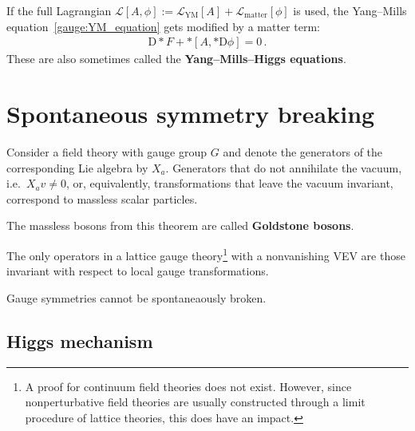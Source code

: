     If the full Lagrangian $\mathcal{L}[A,\phi]:=\mathcal{L}_{\text{YM}}[A]+\mathcal{L}_{\text{matter}}[\phi]$ is used, the Yang--Mills equation~\eqref{gauge:YM_equation} gets modified by a matter term:
    \begin{gather}
        \mathrm{D}\ast F + \ast[A,\ast\mathrm{D}\phi]=0\,.
    \end{gather}
    These are also sometimes called the \textbf{Yang--Mills--Higgs equations}.


\section{Spontaneous symmetry breaking}

    \begin{theorem}[Goldstone]
        Consider a field theory with gauge group $G$ and denote the generators of the corresponding Lie algebra by $X_a$. Generators that do not annihilate the vacuum, i.e.~$X_av\neq0$, or, equivalently, transformations that leave the vacuum invariant, correspond to massless scalar particles.
    \end{theorem}
    The massless bosons from this theorem are called \textbf{Goldstone bosons}.

    \begin{theorem}[Elitzur]\label{gauge:elitzur}
        The only operators in a lattice gauge theory\footnote{A proof for continuum field theories does not exist. However, since nonperturbative field theories are usually constructed through a limit procedure of lattice theories, this does have an impact.} with a nonvanishing VEV are those invariant with respect to local gauge transformations.
    \end{theorem}
    \begin{result}
        Gauge symmetries cannot be spontaneaously broken.
    \end{result}

\subsection{Higgs mechanism}\label{section:higgs_mechanism}


